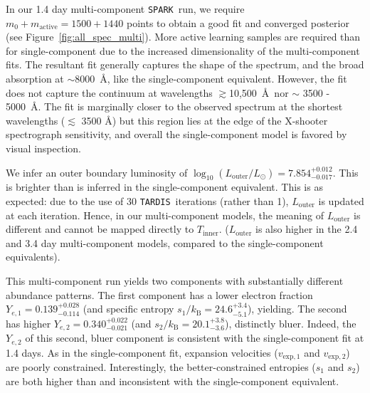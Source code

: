 \documentclass[twocolumn,twocolappendix]{aastex63}
\def\SPARK{\texttt{SPARK}}
\def\TARDIS{\texttt{TARDIS}}
\begin{document}
In our 1.4 day multi-component \SPARK~run, we require $m_0 + m_{\mathrm{active}} = 1500 + 1440$ points to obtain a good fit and converged posterior (see Figure~\ref{fig:all_spec_multi}). More active learning samples are required than for single-component due to the increased dimensionality of the multi-component fits. The resultant fit generally captures the shape of the spectrum, and the broad absorption at $\sim$8000~\AA, like the single-component equivalent. However, the fit does not capture the continuum at wavelengths $\gtrsim$10,500~\AA~nor $\sim$ 3500 - 5000~\AA. The fit is marginally closer to the observed spectrum at the shortest wavelengths ($\lesssim$ 3500 \AA) but this region lies at the edge of the X-shooter spectrograph sensitivity, and overall the single-component model is favored by visual inspection. 

We infer an outer boundary luminosity of $\log_{10} (L_{\mathrm{outer}}/L_{\odot}) = 7.854^{+0.012}_{-0.017}$. This is brighter than is inferred in the single-component equivalent. This is as expected: due to the use of 30 \TARDIS~iterations (rather than 1), $L_{\mathrm{outer}}$ is updated at each iteration. Hence, in our multi-component models, the meaning of $L_{\mathrm{outer}}$ is different and cannot be mapped directly to $T_{\mathrm{inner}}$. ($L_{\mathrm{outer}}$ is also higher in the 2.4 and 3.4 day multi-component models, compared to the single-component equivalents).

This multi-component run yields two components with substantially different abundance patterns. The first component has a lower electron fraction $Y_{e,1} = 0.139^{+0.028}_{-0.114}$ (and specific entropy $s_1 / k_{\mathrm{B}} = 24.6^{+3.4}_{-5.1}$), yielding. The second has higher $Y_{e,2} = 0.340^{+0.022}_{-0.021}$ (and $s_2 / k_{\mathrm{B}} = 20.1^{+3.8}_{-3.6}$), distinctly bluer. Indeed, the $Y_{e,2}$ of this second, bluer component is consistent with the single-component fit at 1.4 days. As in the single-component fit, expansion velocities ($v_{\mathrm{exp},1}$ and $v_{\mathrm{exp},2}$) are poorly constrained. Interestingly, the better-constrained entropies ($s_1$ and $s_2$) are both higher than and inconsistent with the single-component equivalent.
\end{document}
